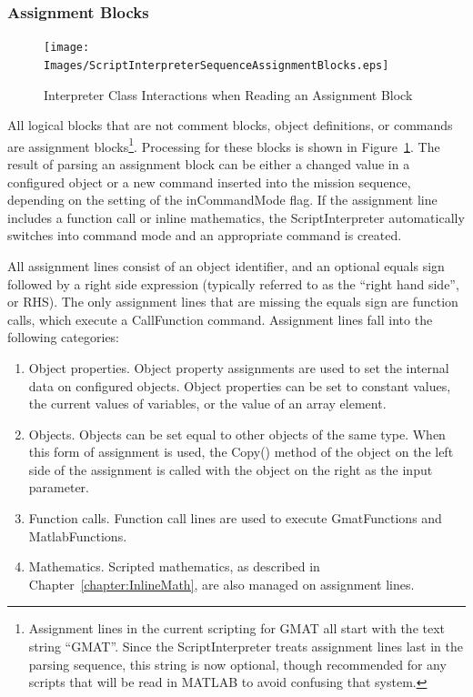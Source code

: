 \subsubsection{Assignment Blocks}

\begin{figure}
\begin{center}
\texttt{[image: Images/ScriptInterpreterSequenceAssignmentBlocks.eps]}
\caption{\label{figure:InterpreterReadInteractionsAssignmentBlock}Interpreter Class Interactions
when Reading an Assignment Block}
\end{center}
\end{figure}

All logical blocks that are not comment blocks, object definitions, or commands are assignment
blocks\footnote{Assignment lines in the current scripting for GMAT all start with the text string
``GMAT''.  Since the ScriptInterpreter treats assignment lines last in the parsing sequence, this
string is now optional, though recommended for any scripts that will be read in MATLAB to avoid
confusing that system.}.  Processing for these blocks is shown in
Figure~\ref{figure:InterpreterReadInteractionsAssignmentBlock}.  The result of parsing an assignment
block can be either a changed value in a configured object or a new command inserted into the
mission sequence, depending on the setting of the inCommandMode flag.  If the assignment line
includes a function call or inline mathematics, the ScriptInterpreter automatically switches into
command mode and an appropriate command is created.

All assignment lines consist of an object identifier, and an optional equals sign followed by a
right side expression (typically referred to as the ``right hand side'', or RHS).  The only
assignment lines that are missing the equals sign are function calls, which execute a CallFunction
command. Assignment lines fall into the following categories:

\begin{enumerate}
\item Object properties.  Object property assignments are used to set the internal data on
configured objects.  Object properties can be set to constant values, the current values of
variables, or the value of an array element.
\item Objects.  Objects can be set equal to other objects of the same type.  When this form of
assignment is used, the Copy() method of the object on the left side of the assignment is called
with the object on the right as the input parameter.
\item Function calls.  Function call lines are used to execute GmatFunctions and MatlabFunctions.
\item Mathematics.  Scripted mathematics, as described in Chapter~\ref{chapter:InlineMath}, are also
managed on assignment lines.
\end{enumerate}


